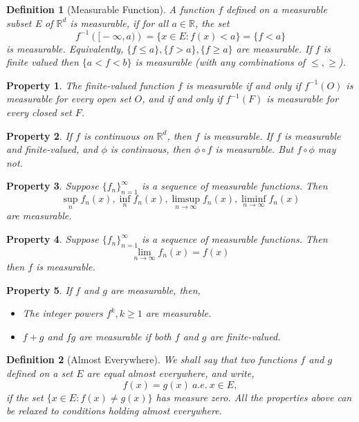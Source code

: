 \documentclass{report}
\theoremstyle{upthm}
\newtheorem{defn}{Definition}
\newtheorem{property}{Property}
\newcommand{\reals}{\mathbb{R}}
\newcommand{\set}[1]{\big\lbrace #1 \big\rbrace}
\begin{document}
\begin{defn}[Measurable Function]
	A function $f$ defined on a measurable subset E of $\reals^d$ is measurable,
	if for all $ a \in \reals$, the set
	$$f^{-1}(\big[-\infty, a\big)) = \set{x \in E: f(x) < a} = \set{f < a}$$ is measurable. Equivalently, $\set{f \leq a}, \set{f > a}, \set{f \geq a}$ are measurable. If $f$ is finite valued then $\set{a < f < b}$ is measurable (with any combinations of $\leq, \geq$).
\end{defn} 
\begin{property}
	The finite-valued function $f$ is measurable if and only if $f^{-1}(O)$ is measurable for every open set $O$, and if and only if $f^{-1}(F)$ is measurable for every closed set $F$.
\end{property}
\begin{property}
	If $f$ is continuous on $\reals^d$, then $f$ is measurable. If $f$ is measurable and finite-valued, and $\phi$ is continuous, then  $\phi \circ f$ is measurable. But $f \circ \phi$ may not.
\end{property}
\begin{property}
	Suppose $\set{f_n}_{n=1}^\infty$ is a sequence of measurable functions. Then $$\sup_n f_n(x), \inf_n f_n(x), \limsup_{n \rightarrow \infty} f_n(x), \liminf_{n \rightarrow \infty} f_n(x)  $$ are measurable.
\end{property}
\begin{property}
	Suppose $\set{f_n}_{n=1}^\infty$ is a sequence of measurable functions. Then $$\lim_{n \rightarrow \infty} f_n(x) = f(x) $$ then $f$ is measurable.
\end{property}
\begin{property}
	If $f$ and $g$ are measurable, then,
	\begin{itemize}
		\item The integer powers $f^k, k \geq 1$ are measurable.
		\item $f + g$ and $fg$ are measurable if both $f$ and $g$ are finite-valued.
	\end{itemize}
\end{property}

\begin{defn}[Almost Everywhere]
	We shall say that two functions $f$ and $g$ defined on a set $E$ are equal almost everywhere, and write,
	$$ f(x) = g(x)\ a.e.\ x \in E,$$
	if the set $\set{x \in E : f(x) \neq g(x)}$ has measure zero. All the properties above can be relaxed to conditions holding almost everywhere.
\end{defn}
\end{document}
